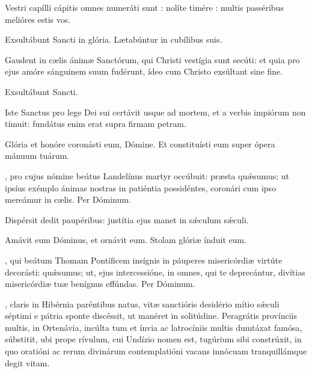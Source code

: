 \documentclass[fontsize=9pt,paper=A6,twoside,BCOR=1mm,DIV=22,headinclude]{scrarticle}
\begin{document}
\begin{multicols}{2}
{
\A Vestri capílli cápitis omnes numeráti sunt : nolíte timére : multis passéribus melióres estis vos.

\V Exsultábunt Sancti in glória.
\R Lætabúntur in cubílibus suis.


\Ant Gaudent in cælis ánimæ Sanctórum, qui Christi vestígia sunt secúti: et quia pro ejus amóre sánguinem suum fudérunt, ídeo cum Christo exsúltant sine fine.

\V Exsultábunt Sancti.

}

\columnbreak
{}

{
\M Iste Sanctus pro lege Dei sui certávit usque ad mortem, et a verbis impiórum non tímuit: fundátus enim erat supra firmam petram.

\V Glória et honóre coronásti eum, Dómine.
\R Et constituísti eum super ópera mánuum tuárum.

, pro cujus nómine beátus Landelínus martyr occúbuit: præsta qu\'æsumus; ut ipsíus exémplo ánimas nostras in patiéntia possidéntes, coronári cum ipso mereámur in cælis. \red{(}Per Dóminum.\red{)}


\Ant Dispérsit dedit paupéribus: justítia ejus manet in sǽculum sǽculi.

\V Amávit eum Dóminus, et ornávit eum.
\R Stolam glóriæ índuit eum.

, qui beátum Thomam Pontíficem insígnis in páuperes misericórdiæ virtúte decorásti: quǽsumus; ut, ejus intercessióne, in omnes, qui te deprecántur, divítias misericórdiæ tuæ benígnus effúndas. Per Dóminum.

}


, claris in Hibérnia paréntibus natus, vitæ sanctióris desidério mítio s\'æculi séptimi e pátria sponte discéssit, ut manéret in solitúdine. Peragrátis provínciis multis, in Ortenávia, incúlta tum et ínvia ac latrocíniis multis dumtáxat famósa, súbstitit, ubi prope rívulum, cui Undízio nomen est, tugúrium sibi constrúxit, in quo oratióni ac rerum divinárum contemplatióni vacans innócuam tranquillámque degit vitam.


\end{multicols}
\end{document}
